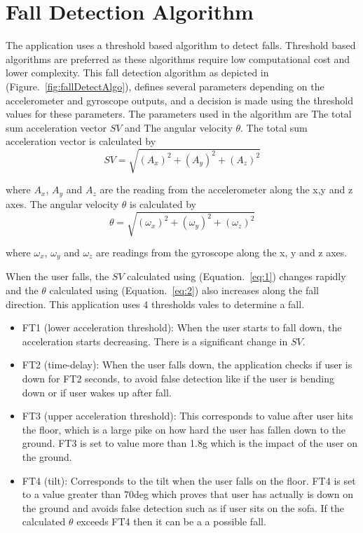 \documentclass[conference]{IEEEtran}
\begin{document}
\section{Fall Detection Algorithm}
The application uses a threshold based algorithm to detect falls. Threshold based algorithms are preferred as these algorithms require low computational cost and lower complexity. This fall detection algorithm as depicted in (Figure.~\ref{fig:fallDetectAlgo}), defines several parameters depending on the accelerometer and gyroscope outputs, and a decision is made using the threshold values for these parameters. The parameters used in the algorithm are The total sum acceleration vector \(SV\) and The angular velocity \(\theta\). The total sum acceleration vector is calculated by
\begin{equation}
 SV = \sqrt{(A_x)^2 + (A_y)^2 + (A_z)^2}\label{eq:1}
 \end{equation}
 
where \(A_x\), \(A_y\) and \(A_z\) are the reading from the accelerometer along the x,y and z axes. The angular velocity \(\theta\) is calculated by 
\begin{equation}
\theta = \sqrt{(\omega_x)^2 + (\omega_y)^2 + (\omega_z)^2}\label{eq:2}
\end{equation}

where \(\omega_x\), \(\omega_y\) and \(\omega_z\) are readings from the gyroscope along the x, y and z axes.

When the user falls, the \(SV\) calculated using (Equation.~\ref{eq:1}) changes rapidly and the \(\theta\) calculated using (Equation.~\ref{eq:2}) also increases along the fall direction. This application uses 4 thresholds vales to determine a fall.
\begin{itemize}
    \item FT1 (lower acceleration threshold): When the user starts to fall down, the acceleration starts decreasing. There is a significant change in \(SV\). 
    \item FT2 (time-delay):  When the user falls down, the application checks if user is down for FT2 seconds, to avoid false detection like if the user is bending down or if user wakes up after fall. 
    \item FT3 (upper acceleration threshold): This corresponds to value after user hits the floor, which is a large pike on how hard the user has fallen down to the ground. FT3 is set to value more than 1.8g which is the impact of the user on the ground. 
    \item FT4 (tilt): Corresponds to the tilt when the user falls on the floor. FT4 is set to a value greater than 70deg which proves that user has actually is down on the ground and avoids false detection such as if user sits on the sofa. If the calculated \(\theta\) exceeds FT4 then it can be a a possible fall.
\end{itemize}
\end{document}
